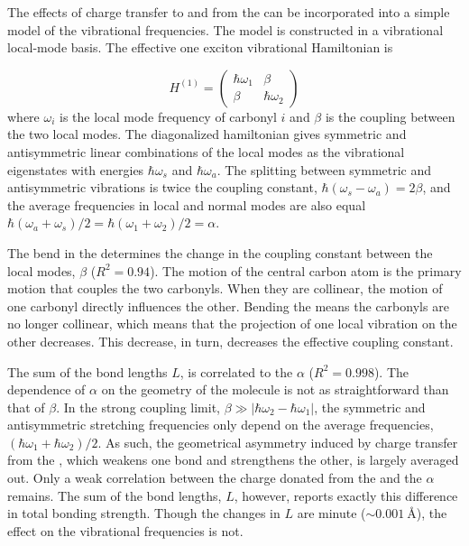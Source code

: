 {The effects of charge transfer to and from the  can be incorporated into a simple model of the vibrational frequencies. The model is constructed in a vibrational local-mode basis. The effective one exciton vibrational Hamiltonian is

\begin{equation}
  H^{(1)} =
  \begin{pmatrix}
    \hbar\omega_1 & \beta\\
    \beta & \hbar\omega_2
  \end{pmatrix}
\end{equation}
where \(\omega_i\) is the local mode frequency of carbonyl \(i\) and \(\beta\) is the coupling between the two local modes. The diagonalized hamiltonian gives symmetric and antisymmetric linear combinations of the local modes as the vibrational eigenstates with energies \(\hbar\omega_s\) and \(\hbar\omega_a\). The splitting between symmetric and antisymmetric vibrations is twice the coupling constant, \(\hbar(\omega_s - \omega_a) = 2\beta\), and the average frequencies in local and normal modes are also equal \(\hbar(\omega_a + \omega_s)/2 = \hbar(\omega_1 + \omega_2)/2 = \alpha\).

The bend in the  determines the change in the coupling constant between the local modes, \(\beta\) (\(R^2 = 0.94\)). The motion of the central carbon atom is the primary motion that couples the two carbonyls. When they are collinear, the motion of one carbonyl directly influences the other. Bending the  means the carbonyls are no longer collinear, which means that the projection of one local vibration on the other decreases. This decrease, in turn, decreases the effective coupling constant.

The sum of the  bond lengths \(L\), is correlated to the \(\alpha\) (\(R^2 = 0.998\)). The dependence of \(\alpha\) on the geometry of the molecule is not as straightforward than that of \(\beta\). In the strong coupling limit, \(\beta \gg |\hbar\omega_2-\hbar\omega_1|\), the symmetric and antisymmetric stretching frequencies only depend on the average frequencies, \((\hbar\omega_1 + \hbar\omega_2)/2\). As such, the geometrical asymmetry induced by charge transfer from the , which weakens one bond and strengthens the other, is largely averaged out. Only a weak correlation between the charge donated from the  and the \(\alpha\) remains. The sum of the bond lengths, \(L\), however, reports exactly this difference in total bonding strength. Though the changes in \(L\) are minute (\(\sim \SI{0.001}{\angstrom}\)), the effect on the vibrational frequencies is not.

}
